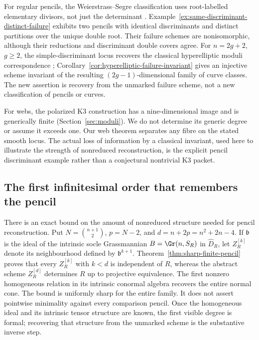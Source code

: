 For regular pencils, the Weierstrass--Segre classification uses
root-labelled elementary divisors, not just the determinant
\cite[Theorem~1.1 and Corollary~2.1]{FevolaMandelshtamSturmfels}.
Example~\ref{ex:same-discriminant-distinct-failure} exhibits two
pencils with identical discriminants and distinct partitions over
the unique double root.  Their failure schemes are nonisomorphic,
although their reductions and discriminant double covers agree.
For \(n=2g+2\), \(g\ge2\), the simple-discriminant locus
recovers the classical hyperelliptic moduli correspondence
\cite[\S4.2]{SmithQuadrics};
Corollary~\ref{cor:hyperelliptic-failure-invariant} gives an
injective scheme invariant of the resulting \((2g-1)\)-dimensional
family of curve classes.  The new assertion is recovery from the
unmarked failure scheme, not a new classification of pencils or curves.

For webs, the polarized K3 construction has a nine-dimensional image
and is generically finite (Section~\ref{sec:moduli}).  We do not
determine its generic degree or assume it exceeds one.  Our web
theorem separates any fibre on the stated smooth locus.  The actual
loss of information by a classical invariant, used here to illustrate
the strength of nonreduced reconstruction, is the explicit pencil
discriminant example rather than a conjectural nontrivial K3 packet.


\subsection{The first infinitesimal order that remembers the pencil}

There is an exact bound on the amount of nonreduced structure needed
for pencil reconstruction.  Put \(N=\binom{n+1}{2}\),
\(p=N-2\), and \(d=n+2p=n^2+2n-4\).  If
\(\mathfrak b\) is the ideal of the intrinsic socle Grassmannian
\(B=\Gr(n,S_R)\) in \(\widehat D_R\), let
\(Z_R^{[k]}\) denote its neighbourhood defined by
\(\mathfrak b^{k+1}\).  Theorem~\ref{thm:sharp-finite-pencil}
proves that every \(Z_R^{[k]}\) with \(k<d\) is independent
of \(R\), whereas the abstract scheme \(Z_R^{[d]}\)
determines \(R\) up to projective equivalence.  The first
nonzero homogeneous relation in its intrinsic conormal algebra
recovers the entire normal cone.  The bound is uniformly sharp for the entire family.  It does not
assert pointwise minimality against every comparison pencil.  Once
the homogeneous ideal and its intrinsic tensor structure are known,
the first visible degree is formal; recovering that structure from
the unmarked scheme is the substantive inverse step.

